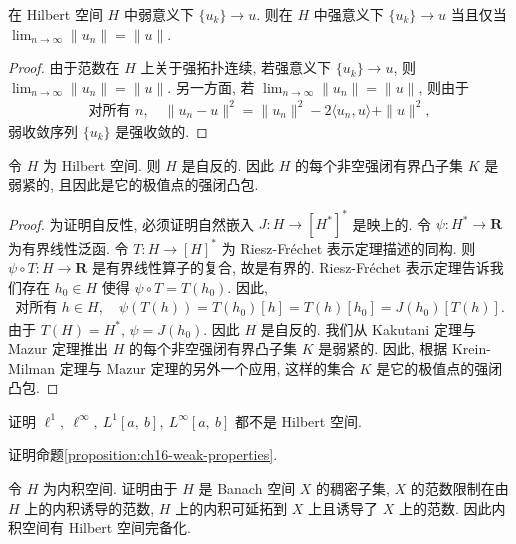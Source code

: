 \documentclass[../../main.tex]{subfiles}
\begin{document}
\begin{theorem}\label{theorem:ch16-radon-riesz}
在 Hilbert 空间 $H$ 中弱意义下 $\{u_{k}\}\to u$. 则在 $H$ 中强意义下 $\{u_{k}\}\to u$ 当且仅当 $\lim_{n\to\infty}\|u_{n}\|=\|u\|$.
\end{theorem}

\begin{proof}
由于范数在 $H$ 上关于强拓扑连续, 若强意义下 $\{u_{k}\}\to u$, 则 $\lim_{n\to\infty}\|u_{n}\|=\|u\|$. 另一方面, 若 $\lim_{n\to\infty}\|u_{n}\|=\|u\|$, 则由于
\begin{align*}
\text{对所有 }n,\quad\|u_{n}-u\|^{2}=\|u_{n}\|^{2}-2\langle u_{n},u\rangle+\|u\|^{2},
\end{align*}
弱收敛序列 $\{u_{k}\}$ 是强收敛的.
\end{proof}

\begin{theorem}\label{theorem:ch16-reflexive}
令 $H$ 为 Hilbert 空间. 则 $H$ 是自反的. 因此 $H$ 的每个非空强闭有界凸子集 $K$ 是弱紧的, 且因此是它的极值点的强闭凸包.
\end{theorem}

\begin{proof}
为证明自反性, 必须证明自然嵌入 $J:H\to[H^{*}]^{*}$ 是映上的. 令 $\psi:H^{*}\to\mathbf{R}$ 为有界线性泛函. 令 $T:H\to[H]^{*}$ 为 Riesz-Fr\'echet 表示定理描述的同构. 则 $\psi\circ T:H\to\mathbf{R}$ 是有界线性算子的复合, 故是有界的. Riesz-Fr\'echet 表示定理告诉我们存在 $h_{0}\in H$ 使得 $\psi\circ T=T(h_{0})$. 因此,
\begin{align*}
\text{对所有 }h\in H,\quad\psi(T(h))=T(h_{0})[h]=T(h)[h_{0}]=J(h_{0})[T(h)].
\end{align*}
由于 $T(H)=H^{*}$, $\psi=J(h_{0})$. 因此 $H$ 是自反的. 我们从 Kakutani 定理与 Mazur 定理推出 $H$ 的每个非空强闭有界凸子集 $K$ 是弱紧的. 因此, 根据 Krein-Milman 定理与 Mazur 定理的另外一个应用, 这样的集合 $K$ 是它的极值点的强闭凸包.
\end{proof}

\begin{exercise}\label{exercise:ch16-16}
证明 $\ell^{1},\ \ell^{\infty},\ L^{1}[a,\ b],\ L^{\infty}[a,\ b]$ 都不是 Hilbert 空间.
\end{exercise}

\begin{exercise}\label{exercise:ch16-17}
证明命题\cref{proposition:ch16-weak-properties}.
\end{exercise}

\begin{exercise}\label{exercise:ch16-18}
令 $H$ 为内积空间. 证明由于 $H$ 是 Banach 空间 $X$ 的稠密子集, $X$ 的范数限制在由 $H$ 上的内积诱导的范数, $H$ 上的内积可延拓到 $X$ 上且诱导了 $X$ 上的范数. 因此内积空间有 Hilbert 空间完备化.
\end{exercise}
\end{document}
